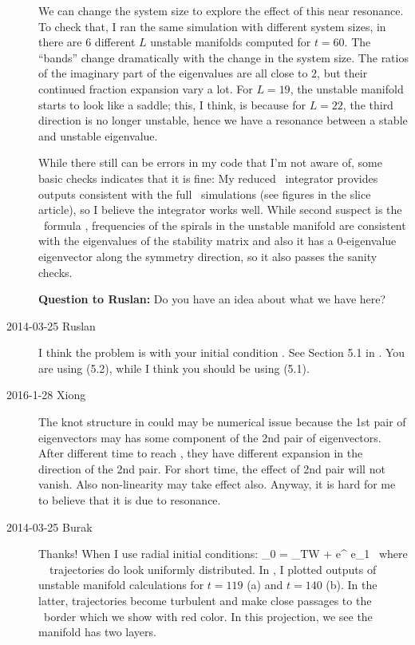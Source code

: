 \begin{description}
We can change the system size to explore the
effect of
this near resonance. To check that, I ran the same simulation with different
system sizes, in  there are $6$ different $L$
unstable
manifolds computed for $t = 60$. The ``bands''
change dramatically with the change in the system size. The ratios of the
imaginary part of the eigenvalues are all close to $2$, but their continued
fraction expansion vary a lot.
For $L=19$, the
unstable manifold starts to look like a saddle; this, I think, is because
for $L=22$, the third direction is no longer unstable, hence we have a resonance
between a stable and unstable eigenvalue.

While there still can be errors in my code that I'm not aware of, some basic
checks indicates that it is fine: My reduced \statesp\ integrator provides
outputs consistent with the full \statesp\ simulations (see figures in the slice
article), so I believe the integrator works well. While second suspect is
the \stabmat\ formula , frequencies of the spirals in the
unstable manifold are consistent with the eigenvalues of the stability matrix
and also it has a $0$-eigenvalue eigenvector along the symmetry direction,
so it also passes the sanity checks.

{\bf Question to Ruslan:} Do you have an idea about what we have here?

\item[2014-03-25 Ruslan]  I think the problem is with your initial
condition .   See Section 5.1 in .
You are using (5.2), while I think you should be using (5.1).

\item[2016-1-28 Xiong]

The knot structure in 
could may be numerical issue because the
1st pair of eigenvectors may has some component of
the 2nd pair of eigenvectors. After different time to
reach \PoincSec, they have different expansion
in the direction of the 2nd pair. For short time,
the effect of 2nd pair will not vanish. Also non-linearity
may take effect also.
Anyway, it is hard for me to believe that it is due to
resonance.

\item[2014-03-25 Burak] Thanks! When I use radial initial conditions:
\beq
  \sspRed_0 = \sspRed_{TW} + \epsilon e^{\delta} e_1 \,
  \mbox{where} \, \delta \in [0, 2 \pi \mu / \nu ] \,
\label{e-TWman_init2}
\eeq
trajectories do look uniformly distributed. In ,
I plotted outputs of unstable manifold calculations for $t=119$ (a) and $t=140$ (b).
In the latter, trajectories become turbulent and make close passages to the
\slicePlane\ border which we show with red color. In this projection, we
see the manifold has two layers.


\end{description}
